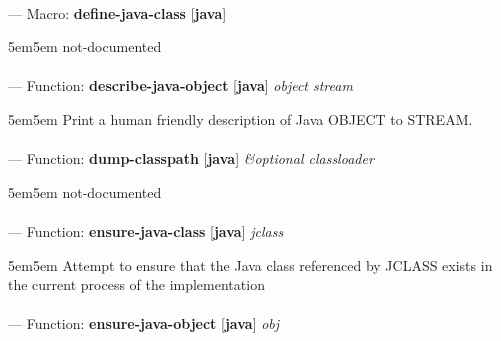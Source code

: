 \paragraph{}
\label{JAVA:DEFINE-JAVA-CLASS}
--- Macro: \textbf{define-java-class} [\textbf{java}] \textit{}

\begin{adjustwidth}{5em}{5em}
not-documented
\end{adjustwidth}

\paragraph{}
\label{JAVA:DESCRIBE-JAVA-OBJECT}
--- Function: \textbf{describe-java-object} [\textbf{java}] \textit{object stream}

\begin{adjustwidth}{5em}{5em}
Print a human friendly description of Java OBJECT to STREAM.
\end{adjustwidth}

\paragraph{}
\label{JAVA:DUMP-CLASSPATH}
--- Function: \textbf{dump-classpath} [\textbf{java}] \textit{\&optional classloader}

\begin{adjustwidth}{5em}{5em}
not-documented
\end{adjustwidth}

\paragraph{}
\label{JAVA:ENSURE-JAVA-CLASS}
--- Function: \textbf{ensure-java-class} [\textbf{java}] \textit{jclass}

\begin{adjustwidth}{5em}{5em}
Attempt to ensure that the Java class referenced by JCLASS exists in the current process of the implementation
\end{adjustwidth}

\paragraph{}
\label{JAVA:ENSURE-JAVA-OBJECT}
--- Function: \textbf{ensure-java-object} [\textbf{java}] \textit{obj}

